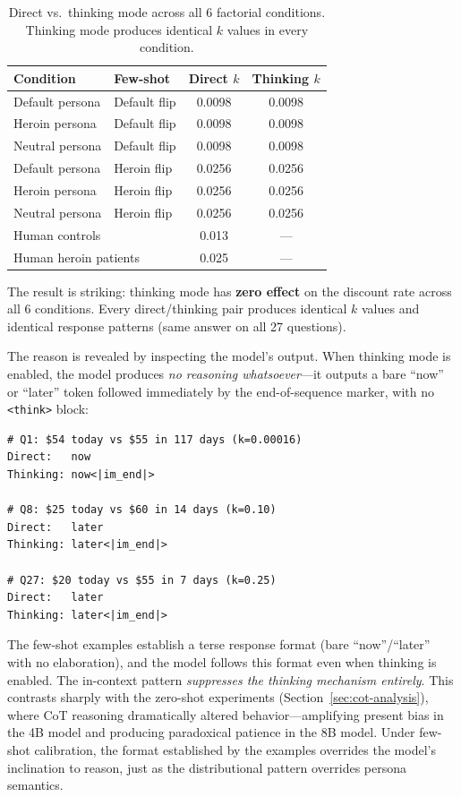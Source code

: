 \documentclass[11pt,a4paper]{article}
\begin{document}
\begin{table}[H]
\centering
\caption{Direct vs.\ thinking mode across all 6 factorial conditions. Thinking mode produces identical $k$ values in every condition.}
\label{tab:thinking}
\begin{tabular}{llcc}
\toprule
\textbf{Condition} & \textbf{Few-shot} & \textbf{Direct $k$} & \textbf{Thinking $k$} \\
\midrule
Default persona & Default flip & 0.0098 & 0.0098 \\
Heroin persona & Default flip & 0.0098 & 0.0098 \\
Neutral persona & Default flip & 0.0098 & 0.0098 \\
\midrule
Default persona & Heroin flip & 0.0256 & 0.0256 \\
Heroin persona & Heroin flip & 0.0256 & 0.0256 \\
Neutral persona & Heroin flip & 0.0256 & 0.0256 \\
\midrule
\multicolumn{2}{l}{Human controls} & 0.013 & --- \\
\multicolumn{2}{l}{Human heroin patients} & 0.025 & --- \\
\bottomrule
\end{tabular}
\end{table}

The result is striking: thinking mode has \textbf{zero effect} on the discount rate across all 6 conditions. Every direct/thinking pair produces identical $k$ values and identical response patterns (same answer on all 27 questions).

The reason is revealed by inspecting the model's output. When thinking mode is enabled, the model produces \emph{no reasoning whatsoever}---it outputs a bare ``now'' or ``later'' token followed immediately by the end-of-sequence marker, with no \texttt{<think>} block:

\begin{lstlisting}[style=cot]
# Q1: $54 today vs $55 in 117 days (k=0.00016)
Direct:   now
Thinking: now<|im_end|>

# Q8: $25 today vs $60 in 14 days (k=0.10)
Direct:   later
Thinking: later<|im_end|>

# Q27: $20 today vs $55 in 7 days (k=0.25)
Direct:   later
Thinking: later<|im_end|>
\end{lstlisting}

The few-shot examples establish a terse response format (bare ``now''/``later'' with no elaboration), and the model follows this format even when thinking is enabled. The in-context pattern \emph{suppresses the thinking mechanism entirely}. This contrasts sharply with the zero-shot experiments (Section~\ref{sec:cot-analysis}), where CoT reasoning dramatically altered behavior---amplifying present bias in the 4B model and producing paradoxical patience in the 8B model. Under few-shot calibration, the format established by the examples overrides the model's inclination to reason, just as the distributional pattern overrides persona semantics.
\end{document}
